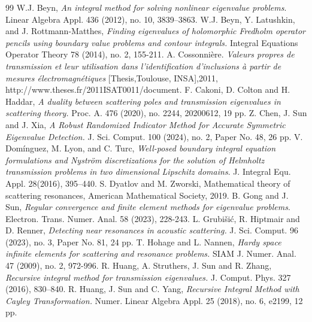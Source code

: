 \documentclass{article}
\begin{document}
	\begin{thebibliography}{99}
		 W.J. Beyn, {\em An integral method for solving nonlinear eigenvalue problems}.  Linear Algebra Appl. 436 (2012), no. 10, 3839–3863.
		 W.J. Beyn, Y. Latushkin, and J. Rottmann-Matthes, {\em Finding eigenvalues of holomorphic Fredholm operator pencils using boundary value problems and contour integrals.} Integral Equations Operator Theory 78 (2014), no. 2, 155-211.
		A. Cossonni\`{e}re. {\em Valeurs propres de transmission et leur utilisation dans l'identification d'inclusions \`{a} partir de mesures électromagn\'{e}tiques} [Thesis,Toulouse, INSA],2011, http://www.theses.fr/2011ISAT0011/document.
		 F. Cakoni, D. Colton and H. Haddar, {\em A duality between scattering poles and transmission eigenvalues in scattering theory.} Proc. A. 476 (2020), no. 2244, 20200612, 19 pp.
		 Z. Chen, J. Sun and J. Xia, {\em A Robust Randomized Indicator Method for Accurate Symmetric Eigenvalue Detection.} J. Sci. Comput. 100 (2024), no. 2, Paper No. 48, 26 pp.
		 V. Dom\'{i}nguez, M. Lyon, and C. Turc, {\em Well-posed boundary integral equation formulations and Nystr\"{o}m discretizations for the solution of Helmholtz transmission problems in two dimensional Lipschitz domains}. J. Integral Equ. Appl. 28(2016), 395–440.
		 S. Dyatlov and M. Zworski, Mathematical theory of scattering resonances, American Mathematical Society, 2019.
		 B. Gong and J. Sun, {\em Regular convergence and finite element methods for eigenvalue problems}. Electron. Trans. Numer. Anal. 58 (2023), 228-243.
		 L. Grubi\v{s}i\'{c}, R. Hiptmair and D. Renner, {\em Detecting near resonances in acoustic scattering.}  J. Sci. Comput. 96 (2023), no. 3, Paper No. 81, 24 pp.
		 T. Hohage and L. Nannen, {\em Hardy space infinite elements for scattering and resonance problems.} SIAM J. Numer. Anal. 47 (2009), no. 2, 972-996.
		 R. Huang, A. Struthers, J. Sun and R. Zhang, {\em Recursive integral method for transmission eigenvalues.} J. Comput. Phys. 327 (2016), 830–840.
		 R. Huang, J. Sun and C. Yang, {\em Recursive Integral Method with Cayley Transformation.} Numer. Linear Algebra Appl. 25 (2018), no. 6, e2199, 12 pp.

\end{thebibliography}
\end{document}
